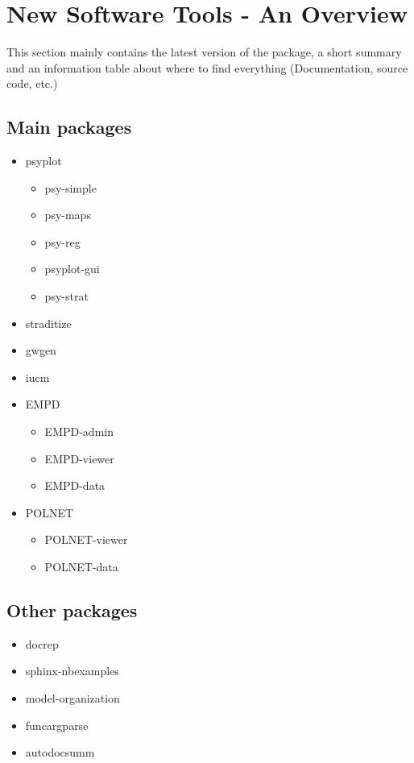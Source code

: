 
\chapter{New Software Tools - An Overview}

\label{chp:software}

This section mainly contains the latest version of the package, a short
summary and an information table about where to find everything
(Documentation, source code, etc.)



\section{Main packages} \label{sec:software-main}

\begin{itemize}
	\item psyplot
	\begin{itemize}
		\item psy-simple
		\item psy-maps
		\item psy-reg
		\item psyplot-gui
		\item psy-strat
	\end{itemize}
	\item straditize
	\item gwgen
	\item iucm
	\item EMPD
	\begin{itemize}
		\item EMPD-admin
		\item EMPD-viewer
		\item EMPD-data
	\end{itemize}
	\item POLNET
	\begin{itemize}
		\item POLNET-viewer
		\item POLNET-data
	\end{itemize}	
\end{itemize}


\section{Other packages} \label{sec:software-others}

\begin{itemize}
	\item docrep
	\item sphinx-nbexamples
	\item model-organization
	\item funcargparse
	\item autodocsumm
\end{itemize}